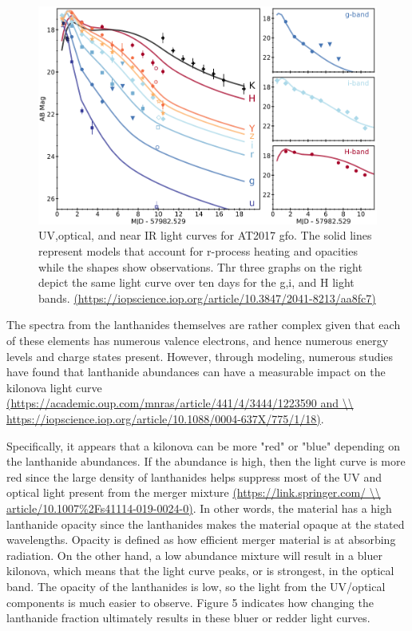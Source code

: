 \documentclass[11pt,a4paper]{article}
\begin{document}
\begin{figure}[h!]
  \includegraphics[width=1\textwidth]{light_curve.png}
  \caption{UV,optical, and near IR light curves for AT2017 gfo. The solid lines represent models that account for r-process heating and opacities while the shapes show observations. Thr three graphs on the right depict the same light curve over ten days for the g,i, and H light bands. \url{(https://iopscience.iop.org/article/10.3847/2041-8213/aa8fc7)} }
\end{figure}

The spectra from the lanthanides themselves are rather complex given that each of these elements has numerous valence electrons, and hence numerous energy levels and charge states present. However, through modeling, numerous studies have found that lanthanide abundances can have a measurable impact on the kilonova light curve \url{(https://academic.oup.com/mnras/article/441/4/3444/1223590 and \\ https://iopscience.iop.org/article/10.1088/0004-637X/775/1/18)}.

Specifically, it appears that a kilonova can be more "red" or "blue" depending on the lanthanide abundances. If the abundance is high, then the light curve is more red since the large density of lanthanides helps suppress most of the UV and optical light present from the merger mixture \url{(https://link.springer.com/ \\ article/10.1007\%2Fs41114-019-0024-0)}. In other words, the material has a high lanthanide opacity since the lanthanides makes the material opaque at the stated wavelengths. Opacity is defined as how efficient merger material is at absorbing radiation. On the other hand, a low abundance mixture will result in a bluer kilonova, which means that the light curve peaks, or is strongest, in the optical band. The opacity of the lanthanides is low, so the light from the UV/optical components is much easier to observe. Figure 5 indicates how changing the lanthanide fraction ultimately results in these bluer or redder light curves. 
\end{document}
